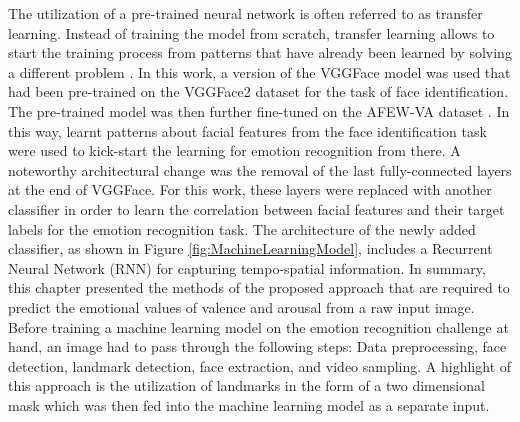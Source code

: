 \noindent The utilization of a pre-trained neural network is often referred to as transfer learning. Instead of training the model from scratch, transfer learning allows to start the training process from patterns that have already been learned by solving a different problem \citep{Pan:2010:SurveyOnTransferLearning}.
\newline\newline
In this work, a version of the VGGFace model was used that had been pre-trained on the VGGFace2 dataset \citep{Cao:2018:VGGFace2} for the task of face identification. The pre-trained model was then further fine-tuned on the AFEW-VA dataset \citep{Kossaifi:2017:AFEW-VADatabase}. In this way, learnt patterns about facial features from the face identification task were used to kick-start the learning for emotion recognition from there. 
\newline\newline
A noteworthy architectural change was the removal of the last fully-connected layers at the end of VGGFace. For this work, these layers were replaced with another classifier in order to learn the correlation between facial features and their target labels for the emotion recognition task. The architecture of the newly added classifier, as shown in Figure \ref{fig:MachineLearningModel}, includes a Recurrent Neural Network (RNN) for capturing tempo-spatial information.
\newline\newline
In summary, this chapter presented the methods of the proposed approach that are required to predict the emotional values of valence and arousal from a raw input image. Before training a machine learning model on the emotion recognition challenge at hand, an image had to pass through the following steps: Data preprocessing, face detection, landmark detection, face extraction, and video sampling. A highlight of this approach is the utilization of landmarks in the form of a two dimensional mask which was then fed into the machine learning model as a separate input.




